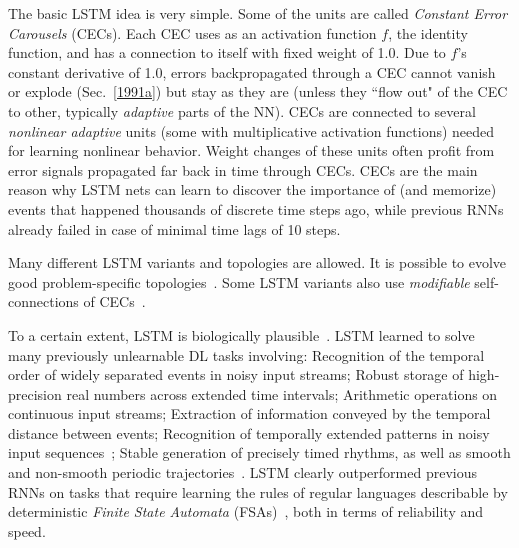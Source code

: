 \documentclass[letterpaper]{article}
\begin{document}
\begin{sloppypar}
The basic LSTM idea is very simple. Some of the units are called {\em Constant Error Carousels} (CECs).
Each CEC uses as an activation function $f$, the identity function, and 
has a connection to itself with fixed weight of 1.0. Due to $f$'s constant derivative of 1.0,  
errors backpropagated through a CEC cannot vanish or explode (Sec.~\ref{1991a})
but stay as they are (unless they ``flow out" 
of the CEC to other, typically {\em adaptive} parts of the NN). 
CECs are connected to several {\em nonlinear adaptive} units (some with multiplicative
activation functions) 
needed for learning nonlinear behavior. Weight changes of these units often 
profit from error signals propagated far back in time
through CECs. 
CECs are the main reason why LSTM nets can learn to discover the importance of (and memorize) events that happened thousands of discrete time steps ago, while previous RNNs already failed in case of minimal time lags of  10 steps.



Many different LSTM variants and topologies are allowed. 
It is possible to evolve good problem-specific topologies~\citep{DBLP:conf/icann/BayerWTS09}.
Some LSTM variants also use {\em modifiable} self-connections of CECs~\citep{Gers:01ieeetnn}.



To a certain extent, LSTM is biologically plausible~\citep{oreilly:2003}.
LSTM learned to solve many previously unlearnable DL tasks involving:
Recognition of the temporal order of widely separated events in noisy input streams; 
Robust storage of high-precision real numbers across extended time intervals;
Arithmetic operations on continuous input streams;
Extraction of information conveyed by the temporal distance between events;
Recognition of temporally extended patterns in noisy input sequences~\citep{lstm97and95,Gers:2000nc};
Stable generation of precisely timed rhythms, as well as 
smooth and non-smooth periodic trajectories~\citep{Gers:2000b}.
LSTM clearly outperformed
previous RNNs on tasks that
require learning the rules of regular languages describable
by deterministic {\em Finite State Automata} (FSAs)~\citep{Watrous:92nips,casey96dynamics,siegelmann93foundations,Blair+Pollack:1997nc,kalinke98computation,zeng94discrete,Manolios:94,Omlin:96,Omlin:04}, both in terms of reliability and speed.


\end{sloppypar}
\end{document}
